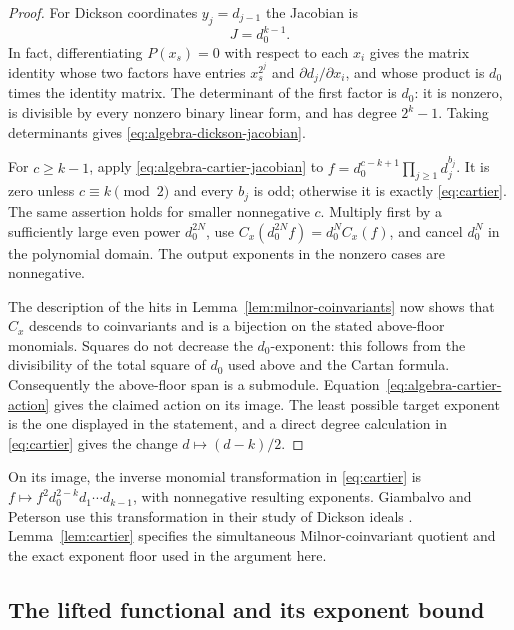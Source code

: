 \begin{proof}
For Dickson coordinates $y_j=d_{j-1}$ the Jacobian is
\begin{equation}\label{eq:algebra-dickson-jacobian}
 J=d_0^{k-1}.
\end{equation}
In fact, differentiating $P(x_s)=0$ with respect to each $x_i$ gives
the matrix identity whose two factors have entries $x_s^{2^j}$ and
$\partial d_j/\partial x_i$, and whose product is $d_0$ times the
identity matrix.  The determinant of the first factor is $d_0$: it is
nonzero, is divisible by every nonzero binary linear form, and has
degree $2^k-1$.  Taking determinants gives
\eqref{eq:algebra-dickson-jacobian}.

For $c\geq k-1$, apply
\eqref{eq:algebra-cartier-jacobian} to
$f=d_0^{c-k+1}\prod_{j\geq1}d_j^{b_j}$.  It is zero unless
$c\equiv k\pmod2$ and every $b_j$ is odd; otherwise it is exactly
\eqref{eq:cartier}.  The same assertion holds for smaller nonnegative
$c$.  Multiply first by a sufficiently large even power $d_0^{2N}$,
use $C_x(d_0^{2N}f)=d_0^NC_x(f)$, and cancel $d_0^N$ in the polynomial
domain.  The output exponents in the nonzero cases are nonnegative.

The description of the hits in
Lemma~\ref{lem:milnor-coinvariants} now shows that $C_x$ descends to
coinvariants and is a bijection on the stated above-floor monomials.
Squares do not decrease the $d_0$-exponent: this follows from the
divisibility of the total square of $d_0$ used above and the Cartan
formula.  Consequently the above-floor span is a submodule.
Equation~\eqref{eq:algebra-cartier-action} gives the claimed action on
its image.  The least possible target exponent is the one displayed
in the statement, and a direct degree calculation in
\eqref{eq:cartier} gives the change $d\mapsto(d-k)/2$.
\end{proof}

\begin{remark}
On its image, the inverse monomial transformation in
\eqref{eq:cartier} is
\(f\mapsto f^2d_0^{2-k}d_1\cdots d_{k-1}\), with nonnegative
resulting exponents. Giambalvo and Peterson use this transformation
in their study of Dickson ideals \cite[\S4]{GiambalvoPeterson2001}.
Lemma~\ref{lem:cartier} specifies the simultaneous Milnor-coinvariant
quotient and the exact exponent floor used in the argument here.
\end{remark}

\subsection{The lifted functional and its exponent bound}

